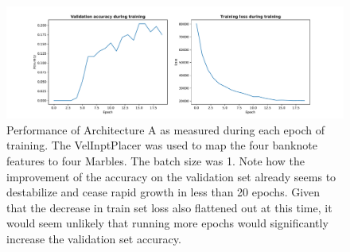 \begin{figure}
	\centering
	\includegraphics[scale=0.4]{figures/A_batch1_velinputplacer.pdf}
	\caption{Performance of Architecture A as measured during each epoch of training. The VelInptPlacer was used to map the four banknote features to four Marbles. The batch size was 1. Note how the improvement of the accuracy on the validation set already seems to destabilize and cease rapid growth in less than 20 epochs. Given that the decrease in train set loss also flattened out at this time, it would seem unlikely that running more epochs would significantly increase the validation set accuracy.}
	\label{fig:velinputplacer_performance}
\end{figure}

\clearpage